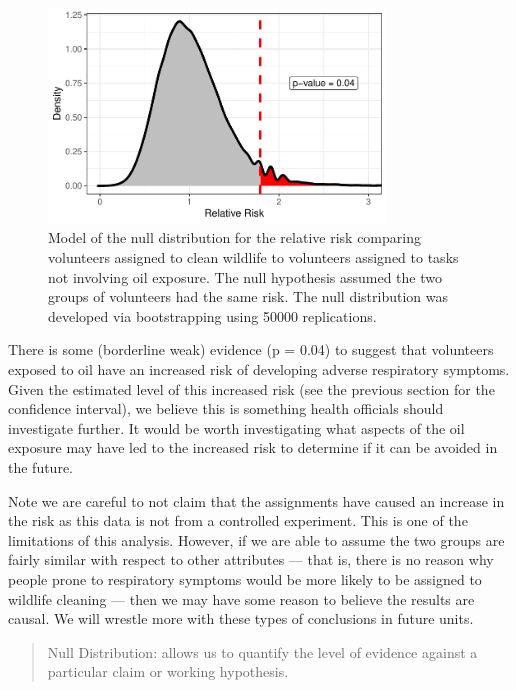\documentclass[
  letterpaper,
  DIV=11,
  numbers=noendperiod]{scrreprt}
\theoremstyle{plain}
\theoremstyle{definition}
\theoremstyle{definition}
\theoremstyle{remark}
\begin{document}
\begin{figure}

{\centering \includegraphics[width=0.8\textwidth,height=\textheight]{./images/fig-recaplanguage-null-distribution-1.pdf}

}

\caption{\label{fig-recaplanguage-null-distribution}Model of the null
distribution for the relative risk comparing volunteers assigned to
clean wildlife to volunteers assigned to tasks not involving oil
exposure. The null hypothesis assumed the two groups of volunteers had
the same risk. The null distribution was developed via bootstrapping
using 50000 replications.}

\end{figure}

There is some (borderline weak) evidence (p = 0.04) to suggest that
volunteers exposed to oil have an increased risk of developing adverse
respiratory symptoms. Given the estimated level of this increased risk
(see the previous section for the confidence interval), we believe this
is something health officials should investigate further. It would be
worth investigating what aspects of the oil exposure may have led to the
increased risk to determine if it can be avoided in the future.

Note we are careful to not claim that the assignments have caused an
increase in the risk as this data is not from a controlled experiment.
This is one of the limitations of this analysis. However, if we are able
to assume the two groups are fairly similar with respect to other
attributes --- that is, there is no reason why people prone to
respiratory symptoms would be more likely to be assigned to wildlife
cleaning --- then we may have some reason to believe the results are
causal. We will wrestle more with these types of conclusions in future
units.

\begin{quote}
Null Distribution: allows us to quantify the level of evidence against a
particular claim or working hypothesis.
\end{quote}
\end{document}
